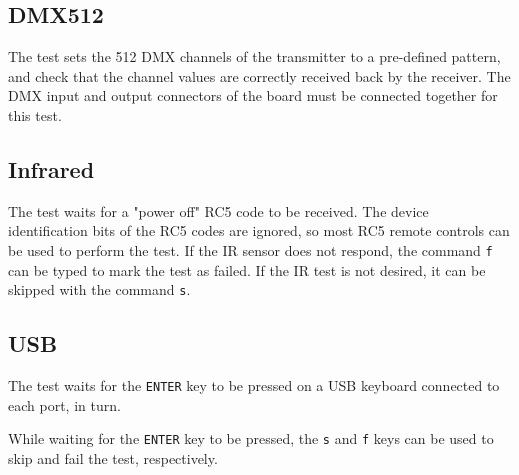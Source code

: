 \documentclass[a4paper,11pt]{article}
\begin{document}
\subsection{DMX512}
The test sets the 512 DMX channels of the transmitter to a pre-defined pattern, and check that the channel values are correctly received back by the receiver. The DMX input and output connectors of the board must be connected together for this test.

\subsection{Infrared}
The test waits for a "power off" RC5 code to be received. The device identification bits of the RC5 codes are ignored, so most RC5 remote controls can be used to perform the test. If the IR sensor does not respond, the command \verb!f! can be typed to mark the test as failed. If the IR test is not desired, it can be skipped with the command \verb!s!.

\subsection{USB}
The test waits for the \verb!ENTER! key to be pressed on a USB keyboard connected to each port, in turn.

While waiting for the \verb!ENTER! key to be pressed, the \verb!s! and \verb!f! keys can be used to skip and fail the test, respectively.
\end{document}
